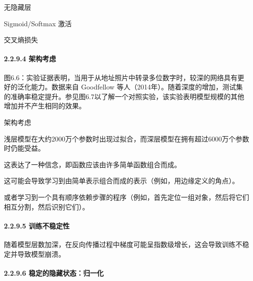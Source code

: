 无隐藏层

Sigmoid/Softmax 激活

交叉熵损失

\paragraph{\texorpdfstring{\textbf{2.2.9.4
架构考虑}}{2.2.9.4 架构考虑}}\label{2294-ux67b6ux6784ux8003ux8651}


图6.6：实验证据表明，当用于从地址照片中转录多位数字时，较深的网络具有更好的泛化能力。数据来自
Goodfellow
等人（2014年）。随着深度的增加，测试集的准确率稳定提升。参见图6.7以了解一个对照实验，该实验表明模型规模的其他增加并不产生相同的效果。

架构考虑


浅层模型在大约2000万个参数时出现过拟合，而深层模型在拥有超过6000万个参数时仍能受益。

这表达了一种信念，即函数应该由许多简单函数组合而成。

这可能会导致学习到由简单表示组合而成的表示（例如，用边缘定义的角点）。

或者学习到一个具有顺序依赖步骤的程序（例如，首先定位一组对象，然后将它们相互分割，然后识别它们）。

\paragraph{\texorpdfstring{\textbf{2.2.9.5}
\textbf{训练不稳定性}}{2.2.9.5 训练不稳定性}}\label{2295-ux8badux7ec3ux4e0dux7a33ux5b9aux6027}

随着模型层数加深，在反向传播过程中梯度可能呈指数级增长，这会导致训练不稳定并导致模型崩溃。


\paragraph{\texorpdfstring{\textbf{2.2.9.6}
\textbf{稳定的隐藏状态：归一化}}{2.2.9.6 稳定的隐藏状态：归一化}}\label{2296-ux7a33ux5b9aux7684ux9690ux85cfux72b6ux6001ux5f52ux4e00ux5316}

